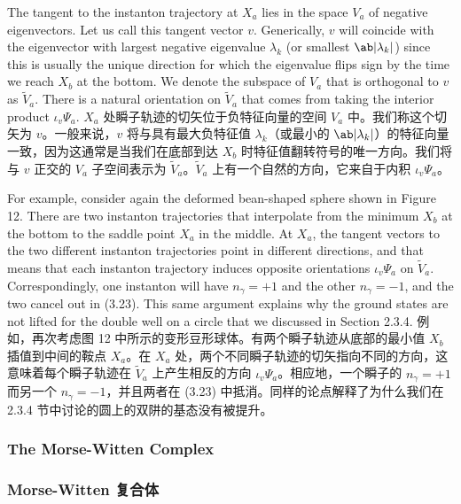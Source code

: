 \documentclass{article}
\begin{document}
\begin{paracol}{2}
The tangent to the instanton trajectory at $X_a$ lies in the space $V_a$ of negative eigenvectors. Let us call this tangent vector $v$. Generically, $v$ will coincide with the eigenvector with largest negative eigenvalue $\lambda_k$ (or smallest $\ab|\lambda_k|$) since this is usually the unique direction for which the eigenvalue ﬂips sign by the time we reach $X_b$ at the bottom. We denote the subspace of $V_a$ that is orthogonal to $v$ as $\tilde{V}_a$. There is a natural orientation on $\tilde{V}_a$ that comes from taking the interior product $\iota_v \Psi_a$.
\switchcolumn
$X_a$ 处瞬子轨迹的切矢位于负特征向量的空间 $V_a$ 中。我们称这个切矢为 $v$。一般来说，$v$ 将与具有最大负特征值 $\lambda_k$（或最小的 $\ab|\lambda_k|$）的特征向量一致，因为这通常是当我们在底部到达 $X_b$ 时特征值翻转符号的唯一方向。我们将与 $v$ 正交的 $V_a$ 子空间表示为 $\tilde{V}_a$。$\tilde{V}_a$ 上有一个自然的方向，它来自于内积 $\iota_v \Psi_a$。
\switchcolumn*

For example, consider again the deformed bean-shaped sphere shown in Figure 12. There are two instanton trajectories that interpolate from the minimum $X_b$ at the bottom to the saddle point $X_a$ in the middle. At $X_a$, the tangent vectors to the two different instanton trajectories point in different directions, and that means that each instanton trajectory induces opposite orientations $\iota_v \Psi_a$ on $\tilde{V}_a$. Correspondingly, one instanton will have $n_{\gamma} = + 1$ and the other $n_{\gamma} = - 1$, and the two cancel out in (3.23). This same argument explains why the ground states are not lifted for the double well on a circle that we discussed in Section 2.3.4.
\switchcolumn
例如，再次考虑图 12 中所示的变形豆形球体。有两个瞬子轨迹从底部的最小值 $X_b$ 插值到中间的鞍点 $X_a$。在 $X_a$ 处，两个不同瞬子轨迹的切矢指向不同的方向，这意味着每个瞬子轨迹在 $\tilde{V}_a$ 上产生相反的方向 $\iota_v \Psi_a$。相应地，一个瞬子的 $n_{\gamma} = + 1$ 而另一个 $n_{\gamma} = - 1$，并且两者在 (3.23) 中抵消。同样的论点解释了为什么我们在 2.3.4 节中讨论的圆上的双阱的基态没有被提升。
\switchcolumn*

\subsubsection{The Morse-Witten Complex}
\switchcolumn
\subsubsection*{Morse-Witten 复合体}
\switchcolumn*


\end{paracol}
\end{document}
